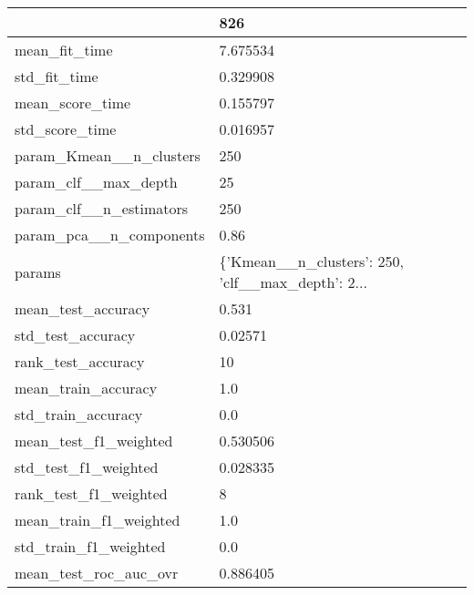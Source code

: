 \begin{tabular}{ll}
\toprule
{} &                                                826 \\
\midrule
mean\_fit\_time               &                                           7.675534 \\
std\_fit\_time                &                                           0.329908 \\
mean\_score\_time             &                                           0.155797 \\
std\_score\_time              &                                           0.016957 \\
param\_Kmean\_\_n\_clusters     &                                                250 \\
param\_clf\_\_max\_depth        &                                                 25 \\
param\_clf\_\_n\_estimators     &                                                250 \\
param\_pca\_\_n\_components     &                                               0.86 \\
params                      &  \{'Kmean\_\_n\_clusters': 250, 'clf\_\_max\_depth': 2... \\
mean\_test\_accuracy          &                                              0.531 \\
std\_test\_accuracy           &                                            0.02571 \\
rank\_test\_accuracy          &                                                 10 \\
mean\_train\_accuracy         &                                                1.0 \\
std\_train\_accuracy          &                                                0.0 \\
mean\_test\_f1\_weighted       &                                           0.530506 \\
std\_test\_f1\_weighted        &                                           0.028335 \\
rank\_test\_f1\_weighted       &                                                  8 \\
mean\_train\_f1\_weighted      &                                                1.0 \\
std\_train\_f1\_weighted       &                                                0.0 \\
mean\_test\_roc\_auc\_ovr       &                                           0.886405 \\

\end{tabular}
